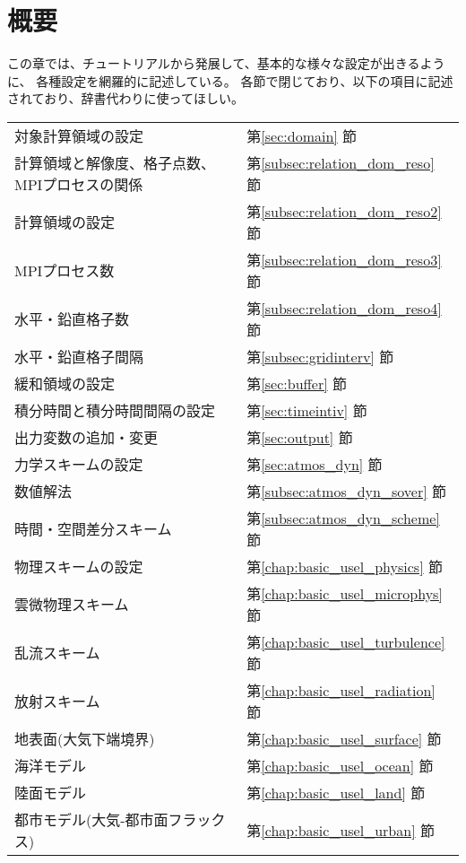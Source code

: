 \section{概要} \label{chap:basic_usel_intro}

この章では、チュートリアルから発展して、基本的な様々な設定が出きるように、
各種設定を網羅的に記述している。
各節で閉じており、以下の項目に記述されており、辞書代わりに使ってほしい。

{%
\begin{center}
\begin{tabular}[h]{ll}\hline
対象計算領域の設定 & 第\ref{sec:domain} 節 \\
計算領域と解像度、格子点数、MPIプロセスの関係 & 第\ref{subsec:relation_dom_reso} 節 \\
計算領域の設定 & 第\ref{subsec:relation_dom_reso2} 節 \\
MPIプロセス数 & 第\ref{subsec:relation_dom_reso3} 節 \\
水平・鉛直格子数 & 第\ref{subsec:relation_dom_reso4} 節 \\
水平・鉛直格子間隔 & 第\ref{subsec:gridinterv} 節 \\
緩和領域の設定 & 第\ref{sec:buffer} 節 \\
積分時間と積分時間間隔の設定 & 第\ref{sec:timeintiv} 節 \\
出力変数の追加・変更 & 第\ref{sec:output} 節\\
力学スキームの設定 & 第\ref{sec:atmos_dyn} 節 \\
数値解法  & 第\ref{subsec:atmos_dyn_sover} 節 \\
時間・空間差分スキーム & 第\ref{subsec:atmos_dyn_scheme} 節 \\
物理スキームの設定 & 第\ref{chap:basic_usel_physics} 節 \\
雲微物理スキーム & 第\ref{chap:basic_usel_microphys} 節 \\
乱流スキーム & 第\ref{chap:basic_usel_turbulence} 節 \\
放射スキーム & 第\ref{chap:basic_usel_radiation} 節 \\
地表面(大気下端境界) & 第\ref{chap:basic_usel_surface} 節 \\
海洋モデル & 第\ref{chap:basic_usel_ocean} 節 \\
陸面モデル & 第\ref{chap:basic_usel_land} 節 \\
都市モデル(大気-都市面フラックス) & 第\ref{chap:basic_usel_urban} 節 \\
\hline
\end{tabular}
\end{center}
}
